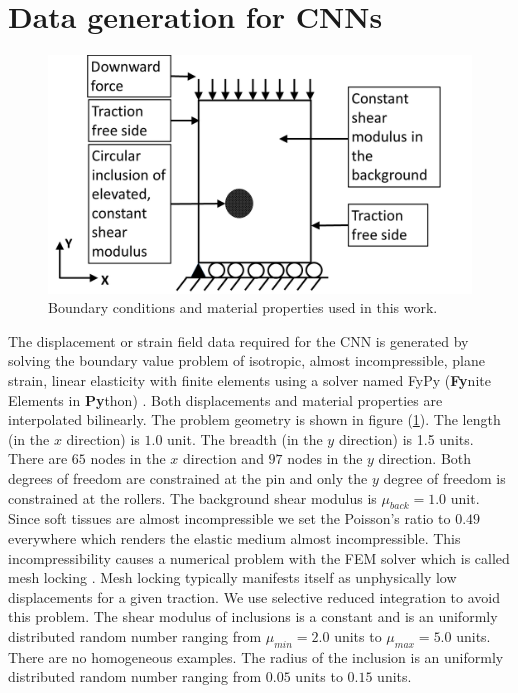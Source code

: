 \documentclass[12pt]{article}
\begin{document}
\section{\label{sect:probsetup}Data generation for CNNs}
%
\begin{figure}[!h] 
   \centering
    \includegraphics[totalheight=5cm]{Figures/bc.png}
  \caption{\label{fig:bc}Boundary conditions and material properties used in this work. }
\end{figure}
%
The displacement or strain field data required for the CNN is generated by solving the boundary value problem of isotropic, almost incompressible, plane strain, linear elasticity \cite{book:segelmathcont} with finite elements \cite{book:hugheslinear,book:fishbelytschko} using a solver named FyPy (\textbf{Fy}nite Elements in \textbf{Py}thon) \cite{misc:fypy}. Both displacements and material properties are interpolated bilinearly. The problem geometry is shown in figure (\ref{fig:bc}). The length (in the $x$ direction) is $1.0$ unit. The breadth (in the $y$ direction) is 1.5 units. There are $65$ nodes in the $x$ direction and $97$ nodes in the $y$ direction. Both degrees of freedom are constrained at the pin and only the $y$ degree of freedom is constrained at the rollers. The background shear modulus is $\mu_{back}=1.0$ unit. Since soft tissues are almost incompressible we set the Poisson's ratio to $0.49$ everywhere which renders the elastic medium almost incompressible. This incompressibility causes a numerical problem with the FEM solver which is called mesh locking \cite{book:hugheslinear}. Mesh locking typically manifests itself as unphysically low displacements for a given traction. We use selective reduced integration \cite{book:hugheslinear} to avoid this problem. The shear modulus of inclusions is a constant and is an uniformly distributed random number ranging from $\mu_{min}=2.0$ units to $\mu_{max}=5.0$ units. There are no homogeneous examples. The radius of the inclusion is an uniformly distributed random number ranging from $0.05$ units to $0.15$ units.
\end{document}
